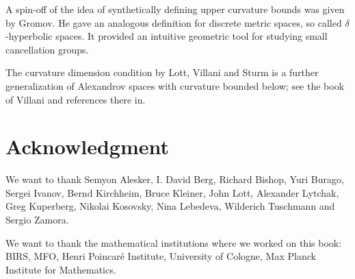 A spin-off of the idea of synthetically defining upper curvature bounds 
was given by Gromov. 
He gave an analogous definition for discrete metric spaces, so called $\delta$-hyperbolic spaces. 
It provided an intuitive geometric tool for studying small cancellation groups.

The curvature dimension condition by Lott, Villani and Sturm is a further generalization of Alexandrov spaces with curvature bounded below; see the book of Villani \cite{villani} and references there
in.

\section*{Acknowledgment}
We want to thank 
Semyon Alesker,
I. David Berg,
Richard Bishop, 
Yuri Burago, 
Sergei Ivanov,
Bernd Kirchheim, 
Bruce Kleiner, 
John Lott,
Alexander Lytchak, 
Greg Kuperberg, 
Nikolai Kosovsky, 
Nina Lebedeva,
Wilderich Tuschmann and
Sergio Zamora.


We want to thank the mathematical institutions where we worked on this book:
BIRS, 
MFO, 
Henri Poincar\'{e} Institute,
University of Cologne, 
Max Planck Institute for Mathematics.



